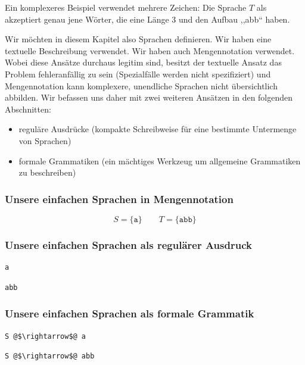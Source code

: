Ein komplexeres Beispiel verwendet mehrere Zeichen: Die Sprache $T$ als  akzeptiert genau jene Wörter, die eine Länge 3 und den Aufbau ,,abb`` haben.

Wir möchten in diesem Kapitel also Sprachen definieren. Wir haben eine textuelle Beschreibung verwendet. Wir haben auch Mengennotation verwendet. Wobei diese Ansätze durchaus legitim sind, besitzt der textuelle Ansatz das Problem fehleranfällig zu sein (Spezialfälle werden nicht spezifiziert) und Mengennotation kann komplexere, unendliche Sprachen nicht übersichtlich abbilden. Wir befassen uns daher mit zwei weiteren Ansätzen in den folgenden Abschnitten:
\begin{itemize}
  \item reguläre Ausdrücke (kompakte Schreibweise für eine bestimmte Untermenge von Sprachen)
  \item formale Grammatiken (ein mächtiges Werkzeug um allgemeine Grammatiken zu beschreiben)
\end{itemize}

\subsubsection*{Unsere einfachen Sprachen in Mengennotation}
\[
  S = \{\texttt{a}\}  \qquad  T = \{\texttt{abb}\}
\]

\subsubsection*{Unsere einfachen Sprachen als regulärer Ausdruck}
\begin{lstlisting}
a
\end{lstlisting}
\begin{lstlisting}
abb
\end{lstlisting}

\subsubsection*{Unsere einfachen Sprachen als formale Grammatik}
\begin{lstlisting}
S @$\rightarrow$@ a
\end{lstlisting}
\begin{lstlisting}
S @$\rightarrow$@ abb
\end{lstlisting}

